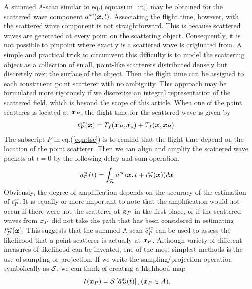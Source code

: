 ﻿\documentclass[11pt,a4j]{article}
\begin{document}
A summed A-scan similar to eq.(\ref{eqn:asum_in}) may be obtained for the 
scattered wave component $a^{sc}(\mbox{\boldmath $x$},t)$. 
Associating the flight time, however, with the scattered wave component is not straightforward. 
This is because scattered waves are generated at every point on the scattering object. 
Consequently, it is not possible to pinpoint where exactly is a scattered wave is originated from. 
 A simple and practical trick to circumvent this difficulty is to model the scattering object 
 as a collection of small, point-like scatterers distributed densely but discretely over 
 the surface of the object. Then the flight time can be assigned to each constituent point scatterer 
 with no ambiguity. This approach may be formulated more rigorously if we discretize an 
 integral representation of the scattered field, which is beyond the scope of this article.
When one of the point scatteres is located at $\mbox{\boldmath $x$}_P$, the flight time for the scattered wave 
 is given by 
\begin{equation}
	t_P^{sc}(\mbox{\boldmath $x$})=
	T_f(\mbox{\boldmath $x$}_P,\mbox{\boldmath $x$}_s)
	+
	T_f(\mbox{\boldmath $x$},\mbox{\boldmath $x$}_P).
	\label{eqn:tsc}
\end{equation}
The subscript $P$ in eq.(\ref{eqn:tsc}) is to remind that the flight time depend 
on the location of the point scatterer.
Then we can align and amplify the scattered wave packets at $t=0$ by the following delay-and-sum operation. 
\begin{equation}
	\bar{a}^{sc}_P(t)=\int _{\cal R} a^{sc}(\mbox{\boldmath $x$},t+t^{sc}_P(\mbox{\boldmath $x$}))d\mbox{\boldmath $x$}
	\label{eqn:asum_sc}
\end{equation}
Obviously, the degree of amplification depends on the accuracy of the estimation of $t^{sc}_P$. 
It is equally or more important to note that the amplification would not occur if there were not 
the scatterer at $\mbox{\boldmath $x$}_P$ in the first place, or if the scattered waves from $\mbox{\boldmath $x$}_P$ did 
not take the path that has been considered in estimating $t^{sc}_P(\mbox{\boldmath $x$})$.
This suggests that the summed A-scan $\bar a^{sc}_P$ can be used to assess the likelihood that 
a point scatterer is actually at $\mbox{\boldmath $x$}_P$. 
Although variety of different measures of likelihood can be invented, one of the 
most simplest methods is the use of sampling or projection. 
If we write the sampling/projection operation symbolically as ${\cal S}$, 
we can think of creating a likelihood map 
\begin{equation}
	I(\mbox{\boldmath $x$}_P)={\cal S} \left[ \bar{a}^{sc}_P(t) \right], 
	(\mbox{\boldmath $x$}_P \in A),
	\label{eqn:image}
\end{equation}
\end{document}
